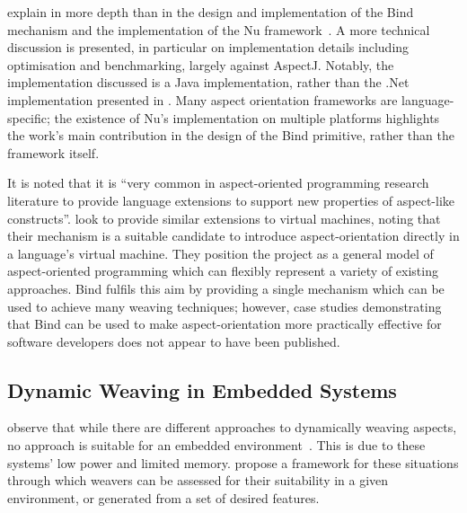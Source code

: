\citeauthor{dyerNUmasters} explain in more depth than in the design
and implementation of the Bind mechanism and the implementation of the Nu
framework~\cite{dyerNUmasters}. A more technical discussion is presented, in
particular on implementation details including optimisation and benchmarking,
largely against AspectJ. Notably, the implementation discussed is a Java
implementation, rather than the .Net implementation presented in
\cite{rajan2006nu}. Many aspect orientation frameworks are language-specific;
the existence of Nu's implementation on multiple platforms highlights the work's
main contribution in the design of the Bind primitive, rather than the
framework itself.

It is noted that it is ``very common in aspect-oriented programming research
literature to provide language extensions to support new properties of
aspect-like constructs''. \citeauthor{rajan2006_towardsao_invocation} look to
provide similar extensions to virtual machines, noting that their mechanism is a
suitable candidate to introduce aspect-orientation directly in a language's
virtual machine. They position the project as a general model of aspect-oriented
programming which can flexibly represent a variety of existing approaches. Bind
fulfils this aim by providing a single mechanism which can be used to achieve
many weaving techniques; however, case studies demonstrating that Bind can be
used to make aspect-orientation more practically effective for software
developers does not appear to have been published.





\subsection{Dynamic Weaving in Embedded Systems}

\citeauthor{gilani2004family} observe that while there are different approaches
to dynamically weaving aspects, no approach is suitable for an embedded
environment~\cite{gilani2004family}. This is due to these systems' low power and
limited memory. \citeauthor{gilani2004family} propose a framework for these
situations through which weavers can be assessed for their suitability in a
given environment, or generated from a set of desired features.

